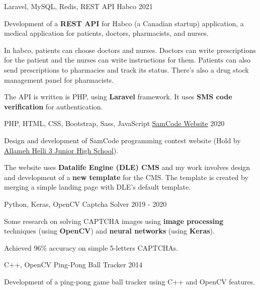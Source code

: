 \begin{cventries}
  \cventry
    {Laravel, MySQL, Redis, REST API} %
    {Habco} %
    {} %
    {2021} %
    {
      \begin{cvitems} %
      	\item {Development of a \textbf{REST API} for Habco (a Canadian startup) application, a medical application for patients, doctors, pharmacists, and nurses.}
      	\item {In habco, patients can choose doctors and nurses. Doctors can write prescriptions for the patient and the nurses can write instructions for them. Patients can also send prescriptions to pharmacies and track its status. There's also a drug stock management panel for pharmacists.}
      	\item {The API is written is PHP, using \textbf{Laravel} framework. It uses \textbf{SMS code verification} for authentication.}
      \end{cvitems}
    }

  \cventry
    {PHP, HTML, CSS, Bootstrap, Sass, JavaScript} %
    {\href{https://samcode.allamehelli3.ir/}{SamCode Website}} %
    {} %
    {2020} %
    {
      \begin{cvitems} %
      	\item {Design and development of SamCode programming contest website (Hold by \href{http://helli3school.ir}{Allameh Helli 3 Junior High School}).}
      	\item {The website uses \textbf{Datalife Engine (DLE) CMS} and my work involves design and development of a \textbf{new template} for the CMS. The template is created by merging a simple landing page with DLE's default template.}
      \end{cvitems}
    }

  \cventry
    {Python, Keras, OpenCV} %
    {Captcha Solver} %
    {} %
    {2019 - 2020} %
    {
      \begin{cvitems} %
      	\item {Some research on solving CAPTCHA images using \textbf{image processing} techniques (using \textbf{OpenCV}) and \textbf{neural networks} (using \textbf{Keras}).}
      	\item {Achieved 96\% accuracy on simple 5-letters CAPTCHAs.}
      \end{cvitems}
    }

  \cventry
    {C++, OpenCV} %
    {Ping-Pong Ball Tracker} %
    {} %
    {2014} %
    {
      \begin{cvitems} %
        \item {Development of a ping-pong game ball tracker using C++ and OpenCV features.}
      \end{cvitems}
    }

\end{cventries}
